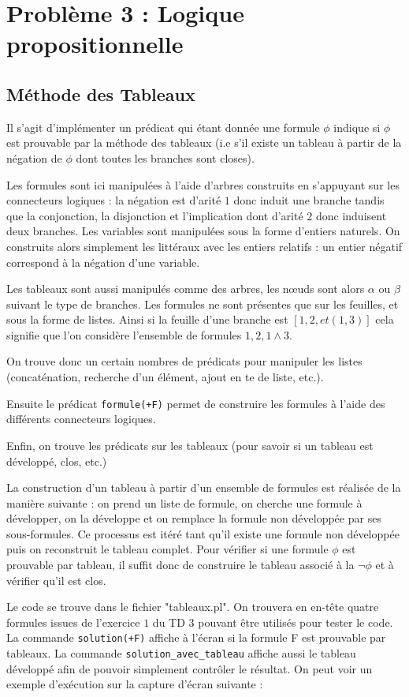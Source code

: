 \documentclass[12pt,a4paper]{article}
\begin{document}
\section{Problème 3 : Logique propositionnelle}
\subsection{Méthode des Tableaux}
Il s'agit d'implémenter un prédicat qui étant donnée une formule $\phi$ indique si $\phi$ est prouvable par la méthode des tableaux (i.e s'il existe un tableau à partir de la négation de $\phi$ dont toutes les branches sont closes).

Les formules sont ici manipulées à l'aide d'arbres construits en s'appuyant sur les connecteurs logiques : la négation est d'arité $1$ donc induit une branche tandis que la conjonction, la disjonction et l'implication dont d'arité $2$ donc induisent deux branches. Les variables sont manipulées sous la forme d'entiers naturels. On construits alors simplement les littéraux avec les entiers relatifs : un entier négatif correspond à la négation d'une variable.

Les tableaux sont aussi manipulés comme des arbres, les nœuds sont alors $\alpha$ ou $\beta$ suivant le type de branches. Les formules ne sont présentes que sur les feuilles, et sous la forme de listes. Ainsi si la feuille d'une branche est $[1,2,et(1,3)]$ cela signifie que l'on considère l'ensemble de formules ${1,2,1\wedge3}$.

On trouve donc un certain nombres de prédicats pour manipuler les listes (concaténation, recherche d'un élément, ajout en te de liste, etc.).

Ensuite le prédicat \texttt{formule(+F)} permet de construire les formules à l'aide des différents connecteurs logiques.

Enfin, on trouve les prédicats sur les tableaux (pour savoir si un tableau est développé, clos, etc.)

La construction d'un tableau à partir d'un ensemble de formules est réalisée de la manière suivante : on prend un liste de formule, on cherche une formule à développer, on la développe et on remplace la formule non développée par ses sous-formules. Ce processus est itéré tant qu'il existe une formule non développée puis on reconstruit le tableau complet. 
Pour vérifier si une formule  $\phi$ est prouvable par tableau, il suffit donc de construire le tableau associé à la $\neg \phi$ et à vérifier qu'il est clos.

Le code se trouve dans le fichier "tableaux.pl". On trouvera en en-tête quatre formules issues de l'exercice $1$ du TD $3$ pouvant être utilisés pour tester le code. La commande \texttt{solution(+F)} affiche à l'écran si la formule F est prouvable par tableaux. La commande \texttt{solution\_avec\_tableau} affiche aussi le tableau développé afin de pouvoir simplement contrôler le résultat. On peut voir un exemple d'exécution sur la capture d'écran suivante : 
\end{document}
